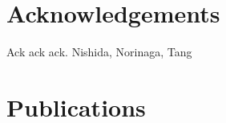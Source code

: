 \documentclass[doctor,12pt]{styles/iscs-thesis}
\date{令和 3 年博士課程入学}
\begin{document}


\maketitle

\frontmatter %
\tableofcontents %
\listoffigures %
\listoftables %

\mainmatter %








\chapter*{Acknowledgements}

Ack ack ack. Nishida, Norinaga, Tang

\chapter*{Publications}

\end{document}
